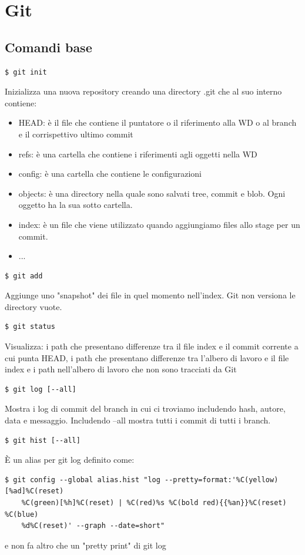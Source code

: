 \section{Git}
\subsection{Comandi base}
\begin{verbatim}
$ git init 
\end{verbatim}
Inizializza una nuova repository creando una directory .git che al suo interno contiene:
\begin{itemize}
    \item HEAD: è il file che contiene il puntatore o il riferimento alla WD o al branch e il corrispettivo ultimo commit 
    \item refs: è una cartella che contiene i riferimenti agli oggetti nella WD
    \item config: è una cartella che contiene le configurazioni 
    \item objects: è una directory nella quale sono salvati tree, commit e blob. Ogni oggetto ha la sua sotto cartella.
    \item index: è un file che viene utilizzato quando aggiungiamo files allo stage per un commit. 
    \item ...
\end{itemize}

\begin{verbatim}
$ git add 
\end{verbatim}
Aggiunge uno "snapshot" dei file in quel momento nell'index. Git non versiona le directory vuote.

\begin{verbatim}
$ git status
\end{verbatim}
Visualizza: i path che presentano differenze tra il file index e il commit corrente a cui punta HEAD, i path che presentano differenze tra l'albero di lavoro e il file index e i path nell'albero di lavoro che non sono tracciati da Git
\begin{verbatim}
$ git log [--all]
\end{verbatim}
Mostra i log di commit del branch in cui ci troviamo includendo hash, autore, data e messaggio. Includendo --all mostra tutti i commit di tutti i branch.

\begin{verbatim}
$ git hist [--all]
\end{verbatim}
È un alias per git log definito come: 
\begin{verbatim}
$ git config --global alias.hist "log --pretty=format:'%C(yellow)[%ad]%C(reset)
    %C(green)[%h]%C(reset) | %C(red)%s %C(bold red){{%an}}%C(reset) %C(blue)
    %d%C(reset)' --graph --date=short"
\end{verbatim}
e non fa altro che un "pretty print" di git log

